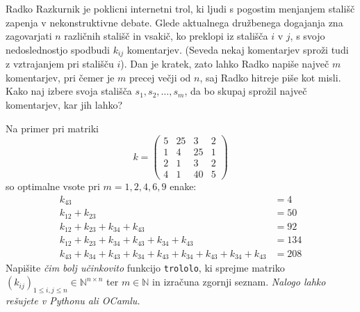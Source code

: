 \documentclass[arhiv]{../izpit}
\begin{document}
Radko Razkurnik je poklicni internetni trol, ki ljudi s pogostim menjanjem stališč zapenja v nekonstruktivne debate. Glede aktualnega družbenega dogajanja zna zagovarjati $n$ različnih stališč in vsakič, ko preklopi iz stališča $i$ v $j$, s svojo nedoslednostjo spodbudi $k_{ij}$ komentarjev. (Seveda nekaj komentarjev sproži tudi z vztrajanjem pri stališču $i$). Dan je kratek, zato lahko Radko napiše največ $m$ komentarjev, pri čemer je $m$ precej večji od $n$, saj Radko hitreje piše kot misli. Kako naj izbere svoja stališča $s_1, s_2, \dots, s_m$, da bo skupaj sprožil največ komentarjev, kar jih lahko?

Na primer pri matriki
\[
  k = \begin{pmatrix}
    5 & 25 & 3 & 2 \\
    1 & 4 & 25 & 1 \\
    2 & 1 & 3 & 2 \\
    4 & 1 & 40 & 5
  \end{pmatrix}
\]
so optimalne vsote pri $m = 1, 2, 4, 6, 9$ enake:
\begin{align*}
  k_{43} &= 4 \\
  k_{12} + k_{23} &= 50 \\
  k_{12} + k_{23} + k_{34} + k_{43} &= 92 \\
  k_{12} + k_{23} + k_{34} + k_{43} + k_{34} + k_{43} &= 134 \\
  k_{43} + k_{34} + k_{43} + k_{34} + k_{43} + k_{34} + k_{43} + k_{34} + k_{43} &= 208
\end{align*}
Napišite \emph{čim bolj učinkovito} funkcijo \verb|trololo|, ki sprejme matriko $(k_{ij})_{1 \le i, j \le n} \in \mathbb{N}^{n \times n}$ ter $m \in \mathbb{N}$ in izračuna zgornji seznam. \emph{Nalogo lahko rešujete v Pythonu ali OCamlu.}
\end{document}
